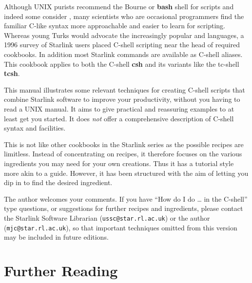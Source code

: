 Although UNIX purists recommend the Bourne or {\bf bash} shell for
scripts and indeed some consider , many
scientists who are occasional programmers find the familiar C-like syntax
more approachable and easier to learn for scripting.  Whereas young
Turks would advocate the increasingly popular  and
 languages, a 1996
survey of Starlink users placed C-shell scripting near the head of
required cookbooks.  In addition most Starlink commands are available
as C-shell aliases.  This cookbook applies to both the C-shell {\bf
csh} and its variants like the tc-shell {\bf tcsh}.

This manual illustrates some relevant techniques for creating C-shell
scripts that combine Starlink software to improve your productivity,
without you having to read a UNIX manual.  It aims to give practical and
reassuring examples to at least get you started.  It does {\em not\/}
offer a comprehensive description of C-shell syntax and facilities.

This is not like other cookbooks in the Starlink series as the
possible recipes are limitless.  Instead of concentrating on recipes,
it therefore focuses on the various ingredients you may need for your
own creations.  Thus it has a tutorial style more akin to a guide.
However, it has been structured with the aim of letting you dip in to
find the desired ingredient.

The author welcomes your comments.  If you have ``How do I do \ldots
in the C-shell'' type questions, or suggestions for further recipes
and ingredients, please contact the Starlink Software Librarian
({\tt{ussc@star.rl.ac.uk}}) or the author ({\tt{mjc@star.rl.ac.uk}}), so that
important techniques omitted from this version may be included in future
editions.

\section{Further Reading}

